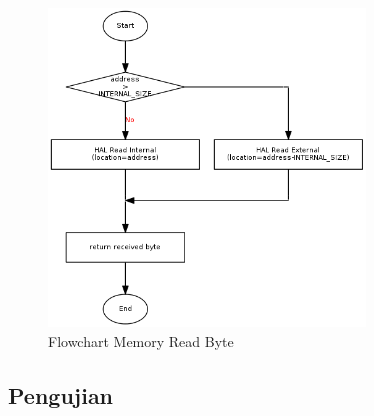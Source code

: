 \begin{figure}[!h]
\centering
\includegraphics[width=0.75\textwidth]{image/memory/flow_readbyte.png}
\caption{Flowchart Memory Read Byte}
\label{fig-flow-readbyte}
\end{figure}

\subsection {Pengujian}

